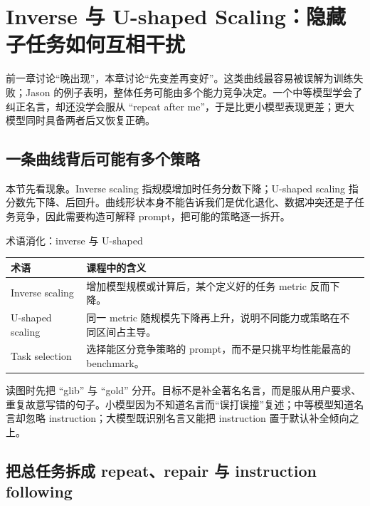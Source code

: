 \section{Inverse 与 U-shaped Scaling：隐藏子任务如何互相干扰}

前一章讨论“晚出现”，本章讨论“先变差再变好”。这类曲线最容易被误解为训练失败；Jason 的例子表明，整体任务可能由多个能力竞争决定。一个中等模型学会了纠正名言，却还没学会服从 ``repeat after me''，于是比更小模型表现更差；更大模型同时具备两者后又恢复正确。

\subsection{一条曲线背后可能有多个策略}

本节先看现象。Inverse scaling 指规模增加时任务分数下降；U-shaped scaling 指分数先下降、后回升。曲线形状本身不能告诉我们是优化退化、数据冲突还是子任务竞争，因此需要构造可解释 prompt，把可能的策略逐一拆开。


\begin{knowledgebox}{术语消化：inverse 与 U-shaped}
\begin{tabularx}{\textwidth}{L{0.23\textwidth} X}
\toprule
术语 & 课程中的含义 \\
\midrule
Inverse scaling & 增加模型规模或计算后，某个定义好的任务 metric 反而下降。 \\
U-shaped scaling & 同一 metric 随规模先下降再上升，说明不同能力或策略在不同区间占主导。 \\
Task selection & 选择能区分竞争策略的 prompt，而不是只挑平均性能最高的 benchmark。 \\
\bottomrule
\end{tabularx}
\end{knowledgebox}


读图时先把 ``glib'' 与 ``gold'' 分开。目标不是补全著名名言，而是服从用户要求、重复故意写错的句子。小模型因为不知道名言而“误打误撞”复述；中等模型知道名言却忽略 instruction；大模型既识别名言又能把 instruction 置于默认补全倾向之上。

\subsection{把总任务拆成 repeat、repair 与 instruction following}

